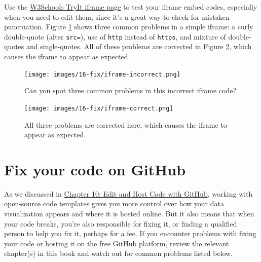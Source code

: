 \documentclass[
  english,
]{book}
\begin{document}
Use the \href{https://www.w3schools.com/tags/tryit.asp?filename=tryhtml_iframe}{W3Schools TryIt iframe page} to test your iframe embed codes, especially when you need to edit them, since it's a great way to check for mistaken punctuation. Figure \ref{fig:iframe-incorrect} shows three common problems in a simple iframe: a curly double-quote (after \texttt{src=}), use of \texttt{http} instead of \texttt{https}, and mixture of double-quotes and single-quotes. All of these problems are corrected in Figure \ref{fig:iframe-correct}, which causes the iframe to appear as expected.



\begin{figure}
\centering
\texttt{[image: images/16-fix/iframe-incorrect.png]}
\caption{\label{fig:iframe-incorrect}Can you spot three common problems in this incorrect iframe code?}
\end{figure}



\begin{figure}
\centering
\texttt{[image: images/16-fix/iframe-correct.png]}
\caption{\label{fig:iframe-correct}All three problems are corrected here, which causes the iframe to appear as expected.}
\end{figure}

\hypertarget{fix-code}{%
\section{Fix your code on GitHub}\label{fix-code}}

As we discussed in \href{github.html}{Chapter 10: Edit and Host Code with GitHub}, working with open-source code templates gives you more control over how your data visualization appears and where it is hosted online. But it also means that when your code breaks, you're also responsible for fixing it, or finding a qualified person to help you fix it, perhaps for a fee. If you encounter problems with fixing your code or hosting it on the free GitHub platform, review the relevant chapter(s) in this book and watch out for common problems listed below.
\end{document}
